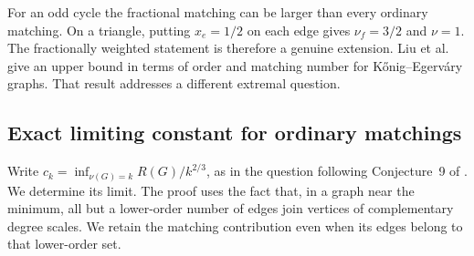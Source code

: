 \documentclass[11pt]{article}
\theoremstyle{remark}\newtheorem{remark}[theorem]{Remark}
\begin{document}
For an odd cycle the fractional matching can be larger than every
ordinary matching. On a triangle, putting $x_e=1/2$ on each edge
gives $\nu_f=3/2$ and $\nu=1$. The fractionally weighted statement is
therefore a genuine extension. Liu et al.\ \cite{Liu} give an upper
bound in terms of order and matching number for K\H{o}nig--Egerv\'ary
graphs. That result addresses a different extremal question.
\subsection{Exact limiting constant for ordinary matchings}

Write $c_k=\inf_{\nu(G)=k}R(G)/k^{2/3}$, as in the question
following Conjecture~9 of \cite{AGGHT}. We determine its limit.
The proof uses the fact that, in a graph near the minimum, all but
a lower-order number of edges join vertices of complementary degree
scales. We retain the matching contribution even when its edges belong
to that lower-order set.
\end{document}
